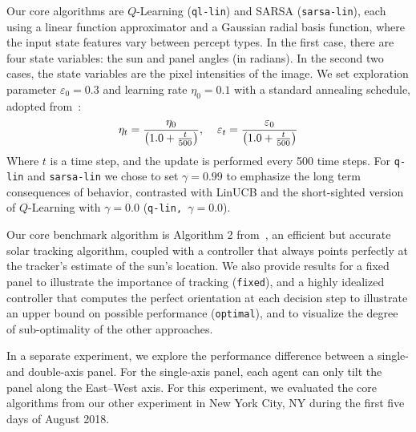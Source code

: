 \documentclass{article}
\begin{document}
{Our core algorithms are $Q$-Learning (\texttt{ql-lin}) and SARSA (\texttt{sarsa-lin}), each using a linear function approximator and a Gaussian radial basis function, where the input state features vary between percept types. In the first case, there are four state variables: the sun and panel angles (in radians). In the second two cases, the state variables are the pixel intensities of the image. We set exploration parameter $\varepsilon_0=0.3$ and learning rate $\eta_0 = 0.1$ with a standard annealing schedule, adopted from~\citet{darken1990note}:
\begin{align*}
\eta_t = \frac{\eta_0}{\left(1.0 + \frac{t}{500}\right)}, \hspace{4mm} \varepsilon_t = \frac{\varepsilon_0}{\left(1.0 + \frac{t}{500}\right)}
\end{align*}
Where $t$ is a time step, and the update is performed every 500 time steps. For  \texttt{q-lin} and \texttt{sarsa-lin} we chose to set $\gamma=0.99$ to emphasize the long term consequences of behavior, contrasted with LinUCB and the short-sighted version of $Q$-Learning with $\gamma = 0.0$ (\texttt{q-lin, $\gamma = 0.0$}).




Our core benchmark algorithm is Algorithm 2 from~\citet{Grena2012}, an efficient but accurate solar tracking algorithm, coupled with a controller that always points perfectly at the tracker's estimate of the sun's location. We also provide results for a fixed panel to illustrate the importance of tracking (\texttt{fixed}), and a highly idealized controller that computes the perfect orientation at each decision step to illustrate an upper bound on possible performance (\texttt{optimal}), and to visualize the degree of sub-optimality of the other approaches.

In a separate experiment, we explore the performance difference between a single- and double-axis panel. For the single-axis panel, each agent can only tilt the panel along the East--West axis. For this experiment, we evaluated the core algorithms from our other experiment in New York City, NY during the first five days of August 2018. 



}
\end{document}
